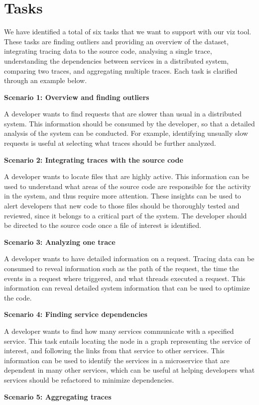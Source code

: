 \section{Tasks}

We have identified a total of six tasks that we want to support with our viz tool. These tasks
are finding outliers and providing an overview of the dataset, integrating tracing data to the source
code, analysing a single trace, understanding the dependencies between services in a distributed system,
comparing two traces, and aggregating multiple traces. Each task is clarified through an example below.

\textbf{Scenario 1: Overview and finding outliers}

A developer wants to find requests that are slower than usual in a distributed system. This information should be consumed by the developer,
so that a detailed analysis of the system can be conducted. For example, identifying unsually slow requests is useful at selecting what traces
should be further analyzed.

\textbf{Scenario 2: Integrating traces with the source code}

A developer wants to locate files that are highly active. This information can be used to understand what areas of the source code are responsible
for the activity in the system, and thus require more attention. These insights can be used to alert developers that new code to those files should
be thoroughly tested and reviewed, since it belongs to a critical part of the system. The developer should be directed to the source code once a file of
interest is identified.

\textbf{Scenario 3: Analyzing one trace}

A developer wants to have detailed information on a request. Tracing data can be consumed to reveal information such as the path of the request, the 
time the events in a request where triggered, and what threads executed a request. This information can reveal detailed system information that can be
used to optimize the code.

\textbf{Scenario 4: Finding service dependencies}

A developer wants to find how many services communicate with a specified service. This task entails locating the node in a graph representing the service of interest,
and following the links from that service to other services. This information can be used to identify the services in a microservice that are dependent in many other
services, which can be useful at helping developers what services should be refactored to minimize dependencies.

\textbf{Scenario 5: Aggregating traces}

